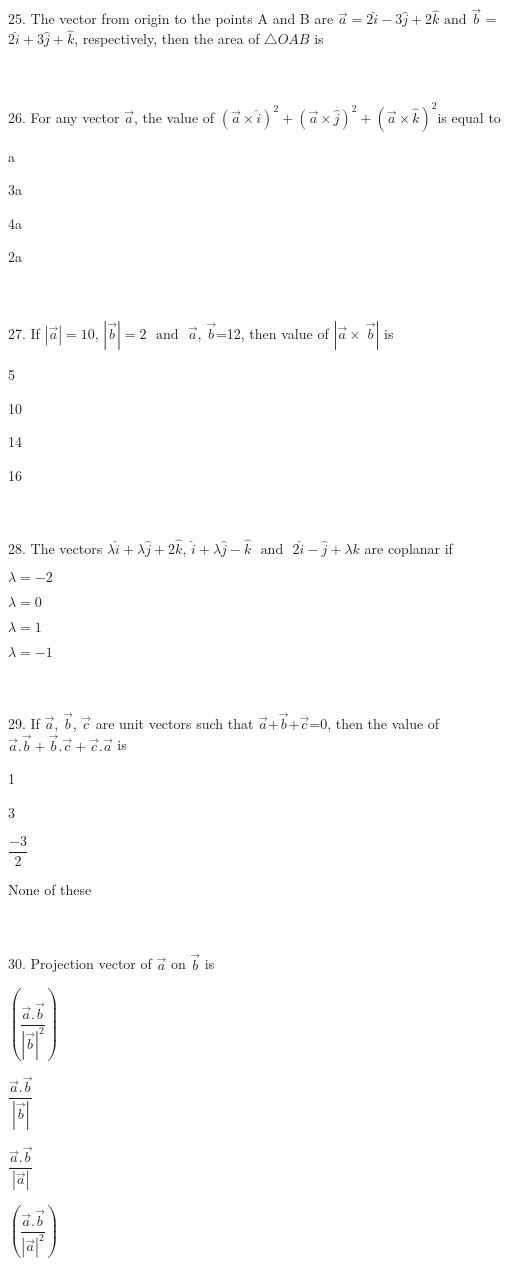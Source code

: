 \documentclass{article}
\newcommand{\choice}{\item}
\begin{document}
\\
\\
25. The vector from origin to the points A and B are $\vec{a} = 2\hat{i}-3\hat{j}+2\hat{k}$ $\text{and}$  $\vec{b}$ = $2\hat{i}+3\hat{j}+\hat{k}$, respectively, then the area of $\triangle {OAB}$ is
\\
\\
26. For any vector $$, the value of $(\times{})^2+(\times{})^2 + (\times{})^2$is equal to 
\begin {choices}[fourcol]
\choice a 
\choice 3a
\choice 4a
\choice 2a
\end{choices}
\\
\\
27. If $||=10$, $||=2$ $$  $$, $$=12, then value of $|\times\ |$ is
\begin {choices}[fourcol]
\choice 5 
\choice 10 
\choice 14 
\choice 16
\end{choices}
\\
\\
28. The vectors $\lambda{}+\lambda{}+2$, $+\lambda{}-$ $$ $2-+$ are coplanar if
\begin {choices}[fourcol]
\choice	$$
\choice $$
\choice $$
\choice	$$
\end{choices}
\\
\\
29. If $$, $$, $$ are unit vectors such that $$+$$+$$=0, then the value of $.+.+.$ is
\begin {choices}[fourcol]
\choice 1
\choice 3
\choice $$
\choice None of these
\end{choices}
\\
\\
30.  Projection vector of $$ on $$ is
\begin {choices}[fourcol]
\choice $\left(\right)$
\choice $$
\choice $$
\choice $\left(\right)$
\end{choices}
\end{document}
